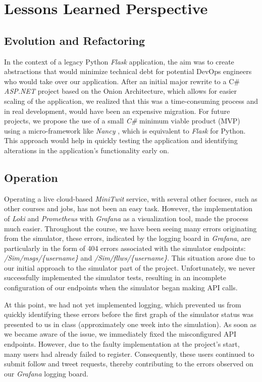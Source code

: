 \chapter{Lessons Learned Perspective}

\section{Evolution and Refactoring}

In the context of a legacy Python \textit{Flask} application, the aim was to create abstractions that would minimize technical debt for potential DevOps engineers who would take over our application. After an initial major rewrite to a C\# \textit{ASP.NET} project based on the Onion Architecture, which allows for easier scaling of the application, we realized that this was a time-consuming process and in real development, would have been an expensive migration. For future projects, we propose the use of a small \textit{C\#} minimum viable product (MVP) using a micro-framework like \textit{Nancy} \cite{nancyfx}, which is equivalent to \textit{Flask} for Python. This approach would help in quickly testing the application and identifying alterations in the application's functionality early on.

\section{Operation}

Operating a live cloud-based \textit{MiniTwit} service, with several other focuses, such as other courses and jobs, has not been an easy task. However, the implementation of \textit{Loki} and \textit{Prometheus} with \textit{Grafana} as a visualization tool, made the process much easier. Throughout the course, we have been seeing many errors originating from the simulator, these errors, indicated by the logging board in \textit{Grafana}, are particularly in the form of 404 errors associated with the simulator endpoints: \textit{/Sim/msgs/\{username\}} and \textit{/Sim/fllws/\{username\}}. This situation arose due to our initial approach to the simulator part of the project. Unfortunately, we never successfully implemented the simulator tests, resulting in an incomplete configuration of our endpoints when the simulator began making API calls.

At this point, we had not yet implemented logging, which prevented us from quickly identifying these errors before the first graph of the simulator status was presented to us in class (approximately one week into the simulation). As soon as we became aware of the issue, we immediately fixed the misconfigured API endpoints. However, due to the faulty implementation at the project's start, many users had already failed to register. Consequently, these users continued to submit follow and tweet requests, thereby contributing to the errors observed on our \textit{Grafana} logging board.

